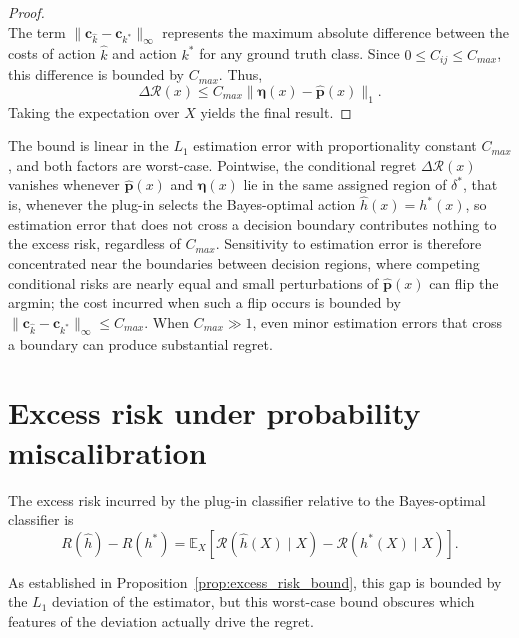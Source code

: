 \begin{proof}
\begin{equation}
\end{equation}
The term $\|\mathbf{c}_{\hat{k}} - \mathbf{c}_{k^*}\|_\infty$ represents the maximum absolute difference between the costs of action $\hat{k}$ and action $k^*$ for any ground truth class. Since $0 \leq C_{ij} \leq C_{max}$, this difference is bounded by $C_{max}$. Thus,
\begin{equation}
    \Delta \mathcal{R}(x) \leq C_{max} \|\boldsymbol{\eta}(x) - \hat{\mathbf{p}}(x)\|_1.
\end{equation}
Taking the expectation over $X$ yields the final result.
\end{proof}

The bound is linear in the $L_1$ estimation error with proportionality constant $C_{max}$, and both factors are worst-case. Pointwise, the conditional regret $\Delta\mathcal{R}(x)$ vanishes whenever $\hat{\mathbf{p}}(x)$ and $\boldsymbol{\eta}(x)$ lie in the same assigned region of $\delta^*$, that is, whenever the plug-in selects the Bayes-optimal action $\hat{h}(x) = h^*(x)$, so estimation error that does not cross a decision boundary contributes nothing to the excess risk, regardless of $C_{max}$. Sensitivity to estimation error is therefore concentrated near the boundaries between decision regions, where competing conditional risks are nearly equal and small perturbations of $\hat{\mathbf{p}}(x)$ can flip the argmin; the cost incurred when such a flip occurs is bounded by $\|\mathbf{c}_{\hat{k}} - \mathbf{c}_{k^*}\|_\infty \leq C_{max}$. When $C_{max} \gg 1$, even minor estimation errors that cross a boundary can produce substantial regret.

\section{Excess risk under probability miscalibration}\label{sec:excess_risk_miscalibration}

The excess risk incurred by the plug-in classifier relative to the Bayes-optimal classifier is
\begin{equation}
    R(\hat{h}) - R(h^*) = \mathbb{E}_{X} \left[ \mathcal{R}(\hat{h}(X) \mid X) - \mathcal{R}(h^*(X) \mid X) \right].
\end{equation}

As established in Proposition~\ref{prop:excess_risk_bound}, this gap is bounded by the $L_1$ deviation of the estimator, but this worst-case bound obscures which features of the deviation actually drive the regret.

